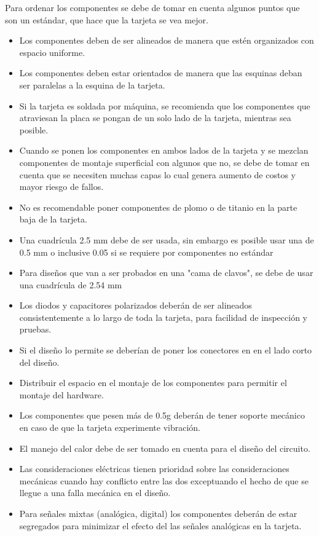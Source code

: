 Para ordenar los componentes se debe de tomar en cuenta algunos puntos que son un estándar, que hace que la tarjeta se vea mejor.

\begin{itemize}
\item Los componentes deben de ser alineados de manera que estén organizados con espacio uniforme.
\item Los componentes deben estar orientados de manera que las esquinas deban ser paralelas a la esquina de la tarjeta.
\item Si la tarjeta es soldada por máquina, se recomienda que los componentes que atraviesan la placa se pongan de un solo lado de la tarjeta, mientras sea posible.
\item Cuando se ponen los componentes en ambos lados de la tarjeta y se mezclan componentes de montaje superficial con algunos que no, se debe de tomar en cuenta que se necesiten muchas capas lo cual genera aumento de costos y mayor riesgo de fallos.
\item No es recomendable poner componentes de plomo o de titanio en la parte baja de la tarjeta.
\item Una cuadrícula 2.5 mm debe de ser usada, sin embargo es posible usar una de 0.5 mm o inclusive 0.05 si se requiere por componentes no estándar
\item Para diseños que van a ser probados en una "cama de clavos", se debe de usar una cuadrícula de 2.54 mm
\item Los diodos y capacitores polarizados deberán de ser alineados consistentemente a lo largo de toda la tarjeta, para facilidad de inspección y pruebas.
\item Si el diseño lo permite se deberían de poner los conectores en en el lado corto del diseño.
\item Distribuir el espacio en el montaje de los componentes para permitir el montaje del hardware.
\item Los componentes que pesen más de 0.5g deberán de tener soporte mecánico en caso de que la tarjeta experimente vibración.
\item El manejo del calor debe de ser tomado en cuenta para el diseño del circuito.
\item Las consideraciones eléctricas tienen prioridad sobre las consideraciones mecánicas cuando hay conflicto entre las dos exceptuando el hecho de que se llegue a una falla mecánica en el diseño.
\item Para señales mixtas (analógica, digital) los componentes deberán de estar segregados para minimizar el efecto del las señales analógicas en la tarjeta.
\end{itemize}

